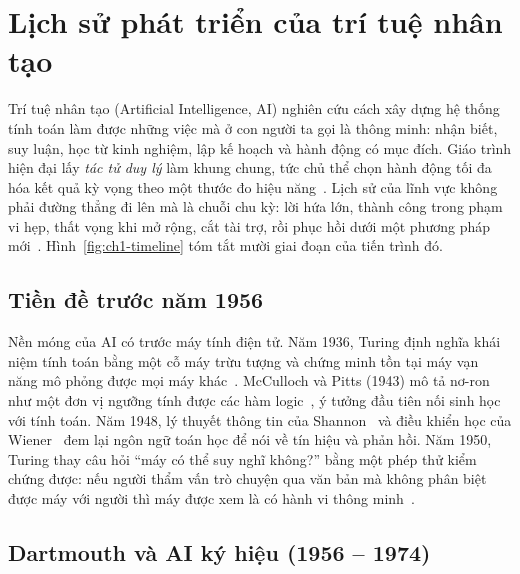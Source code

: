\chapter{Lịch sử phát triển của trí tuệ nhân tạo}\label{chap:lichsu}

Trí tuệ nhân tạo (Artificial Intelligence, AI) nghiên cứu cách xây dựng hệ thống tính toán làm được những việc mà ở con
người ta gọi là thông minh: nhận biết, suy luận, học từ kinh nghiệm, lập kế hoạch và hành động có mục đích. Giáo trình hiện
đại lấy \emph{tác tử duy lý} làm khung chung, tức chủ thể chọn hành động tối đa hóa kết quả kỳ vọng theo một thước đo hiệu
năng~\cite{ch1:russell2021}. Lịch sử của lĩnh vực không phải đường thẳng đi lên mà là chuỗi chu kỳ: lời hứa lớn, thành công
trong phạm vi hẹp, thất vọng khi mở rộng, cắt tài trợ, rồi phục hồi dưới một phương pháp mới~\cite{ch1:nilsson2010}.
Hình~\ref{fig:ch1-timeline} tóm tắt mười giai đoạn của tiến trình đó.


\section{Tiền đề trước năm 1956}

Nền móng của AI có trước máy tính điện tử. Năm 1936, Turing định nghĩa khái niệm tính toán bằng một cỗ máy trừu tượng và
chứng minh tồn tại máy vạn năng mô phỏng được mọi máy khác~\cite{ch1:turing1936}. McCulloch và Pitts (1943) mô tả nơ-ron như
một đơn vị ngưỡng tính được các hàm logic~\cite{ch1:mcculloch1943}, ý tưởng đầu tiên nối sinh học với tính toán. Năm 1948,
lý thuyết thông tin của Shannon~\cite{ch1:shannon1948} và điều khiển học của Wiener~\cite{ch1:wiener1948} đem lại ngôn ngữ
toán học để nói về tín hiệu và phản hồi. Năm 1950, Turing thay câu hỏi ``máy có thể suy nghĩ không?'' bằng một phép thử kiểm
chứng được: nếu người thẩm vấn trò chuyện qua văn bản mà không phân biệt được máy với người thì máy được xem là có hành vi
thông minh~\cite{ch1:turing1950}.

\section{Dartmouth và AI ký hiệu (1956 -- 1974)}

